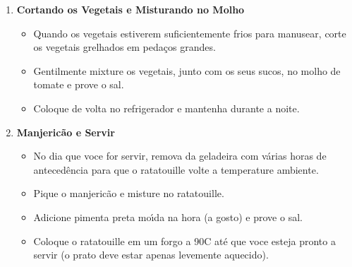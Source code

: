 \documentclass [11pt, letterpaper] {article}
\begin{document}
\begin{description}
\begin{enumerate}
\begin{itemize}
		\item Grelhe as abrobinhas ate' que elas estejam grelhadas mas ainda com uma consist\^encia firme, vire com uma espatula met\'alica. 
		\item Quando remover da grelha, coloque em uma tigela e cubra para elas continuem cozinhando enquanto esfriam.
	\end{itemize}
	\item {\bf Cortando os Vegetais e Misturando no Molho}
	\begin{itemize}	
		\item Quando os vegetais estiverem suficientemente frios para manusear, corte os vegetais grelhados em peda\c{c}os grandes. 
		\item Gentilmente mixture os vegetais, junto com os seus sucos, no molho de tomate e prove o sal.
		\item Coloque de volta no refrigerador e mantenha durante a noite.
	\end{itemize}
	\item{\bf Manjeric\~ao e Servir}
	\begin{itemize}	
		\item No dia que voce for servir, remova da geladeira com v\'arias horas de anteced\^encia para que o ratatouille volte a temperature ambiente.
		\item Pique o manjeric\~ao e misture no ratatouille.
		\item Adicione pimenta preta mo\'{\i}da na hora (a gosto) e prove o sal.
		\item Coloque o  ratatouille em um forgo a 90C at\'e que voce esteja pronto a servir (o prato deve estar apenas levemente aquecido).
	\end{itemize}	
     	\end{enumerate}         
\end{description}
\end{document}
